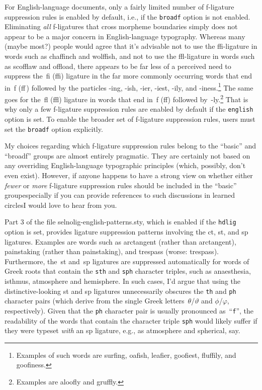 \documentclass[11pt]{article}
\newcommand{\pkg}[1]{\textsf{#1}}
\newcommand{\opt}[1]{\texttt{#1}}
\begin{document}
For English-language documents, only a fairly limited number of f-ligature suppression rules is enabled by default, i.e., if the \opt{broadf} option is not enabled. Eliminating \emph{all} f-ligatures that cross morpheme boundaries simply does not appear to be a major concern in English-language typography. Whereas many (maybe most?) people would agree that it's advisable not to use the ffi-ligature in words such as chaffinch and wolffish, and not to use the ffl-ligature in words such as scofflaw and offload, there appears to be far less of a perceived need to suppress the~fi (ffi) ligature in the far more commonly occurring words that end in~f (ff\,) followed by the particles -ing, -ish, -ier, -iest, -ily, and -iness.\footnote{Examples of such words are sur\mbox{fi}ng, oa\mbox{fi}sh, lea\mbox{fi}er, goo\mbox{fi}est, flu\mbox{ffi}ly, and goo\mbox{fi}ness.} The same goes for the~fl (ffl) ligature in words that end in~f (ff) followed by~-ly.\footnote{Examples are \mbox{aloofly} and \mbox{gruffly}.} That is why only a few f-ligature suppression rules are enabled by default if the \opt{english} option is set. To enable the broader set of f-ligature suppression rules, users must set the \opt{broadf} option explicitly.

My choices regarding which f-ligature suppression rules belong to the \enquote{basic} and \enquote{broadf} groups are almost entirely pragmatic. They are certainly not based on any overriding English-language typographic principles (which, possibly, don't even exist). However, if anyone happens to have a strong view on whether either \emph{fewer} or \emph{more} f-ligature suppression rules should be included in the \enquote{basic} group\textemdash especially if you can provide references to such discussions in learned circles\textemdash I would love to hear from you.


Part 3 of the file \pkg{selnolig-english-patterns.sty}, which is enabled if the \opt{hdlig} option is set, provides ligature suppression patterns involving the \mbox{ct}, \mbox{st}, and \mbox{sp} ligatures. Examples are words such as arctangent (rather than ar\mbox{ct}angent), painstaking (rather than pain\mbox{st}aking), and trespass (worse: tre\mbox{sp}ass). Furthermore, the~st and~sp ligatures are suppressed automatically for words of Greek roots that contain the \opt{sth} and \opt{sph} character triples, such as anaesthesia, isthmus, atmosphere and hemisphere. In such cases, I'd argue that using the distinctive-looking st and sp ligatures unnecessarily obscures the \opt{th} and \opt{ph} character pairs (which derive from the single Greek letters~$\theta$/$\vartheta$ and $\phi$/$\varphi$, respectively). Given that the \opt{ph} character pair is usually pronounced as~\enquote{\opt{f}}, the readability of the words that contain the character triple \opt{sph} would likely suffer if they were typeset \emph{with} an sp ligature, e.g., as atmo\mbox{sp}here and \mbox{sp}herical, say.
\end{document}
